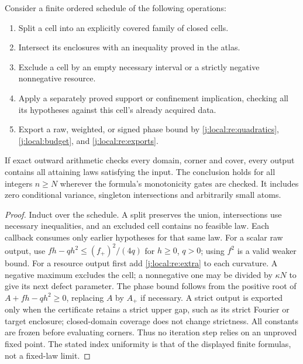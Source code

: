 \begin{theorem}\label{j:local:acquisition}
Consider a finite ordered schedule of the following operations:
\begin{enumerate}
\item Split a cell into an explicitly covered family of closed cells.
\item Intersect its enclosures with an inequality proved in the atlas.
\item Exclude a cell by an empty necessary interval or a strictly
negative nonnegative resource.
\item Apply a separately proved support or confinement implication,
checking all its hypotheses against this cell's already acquired data.
\item Export a raw, weighted, or signed phase bound by
\eqref{j:local:re:quadratics}, \eqref{j:local:budget}, and \eqref{j:local:re:exports}.
\end{enumerate}
If exact outward arithmetic checks every domain, corner and cover,
every output contains all attaining laws satisfying the input. The
conclusion holds for all integers $n\ge N$ wherever the formula's
monotonicity gates are checked. It includes zero conditional variance,
singleton intersections and arbitrarily small atoms.
\end{theorem}
\begin{proof}
Induct over the schedule. A split preserves the union, intersections use
necessary inequalities, and an excluded cell contains no feasible law.
Each callback consumes only earlier hypotheses for that same law.
For a scalar raw output, use
$fh-qh^2\le(f_+)^2/(4q)$ for $h\ge0$, $q>0$; using $f^2$ is a valid
weaker bound. For a resource output first add \eqref{j:local:re:extra} to each
curvature. A negative maximum excludes the cell; a nonnegative one may
be divided by $\kappa N$ to give its next defect parameter.
The phase bound follows from the positive root of
$A+fh-qh^2\ge0$, replacing $A$ by $A_+$ if necessary.
A strict output is exported only when the certificate retains a strict
upper gap, such as its strict Fourier or target enclosure; closed-domain
coverage does not change strictness. All constants are frozen before evaluating
corners. Thus no iteration
step relies on an unproved fixed point. The stated index uniformity is
that of the displayed finite formulas, not a fixed-law limit.
\end{proof}

